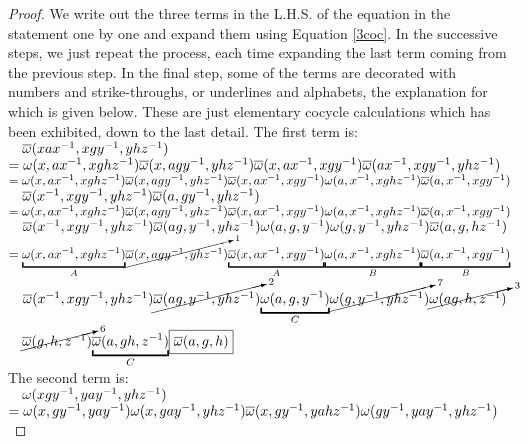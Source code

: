 \begin{proof}
We write out the three terms in the L.H.S. of the equation in the statement one by one and expand them using Equation \ref{3coc}. 
In the successive steps, we just repeat the process, each time expanding the last term coming from the previous step. In the final step, some of the terms are decorated with numbers and strike-throughs, or underlines and alphabets, the explanation for which is given below. These are just elementary cocycle calculations which has been exhibited, down to the last detail. 
The first term is:\\
$\text{ }\text{ }\text{ }\overline{\omega}(xax^{-1}, xgy^{-1}, yhz^{-1})$\\
$=\omega(x, ax^{-1}, xghz^{-1}) \overline{\omega}(x, agy^{-1}, yhz^{-1}) \overline{\omega}(x, ax^{-1}, xgy^{-1}) \overline{\omega}(ax^{-1}, xgy^{-1}, yhz^{-1})$\\
$=\omega(x, ax^{-1}, xghz^{-1}) \overline{\omega}(x, agy^{-1}, yhz^{-1}) \overline{\omega}(x, ax^{-1}, xgy^{-1}) \omega(a, x^{-1}, xghz^{-1}) \overline{\omega}(a, x^{-1}, xgy^{-1})$\\
$\text{ }\text{ }\text{ }\overline{\omega}(x^{-1}, xgy^{-1}, yhz^{-1}) \overline{\omega}(a, gy^{-1}, yhz^{-1})$\\
$=\omega(x, ax^{-1}, xghz^{-1}) \overline{\omega}(x, agy^{-1}, yhz^{-1}) \overline{\omega}(x, ax^{-1}, xgy^{-1}) \omega(a, x^{-1}, xghz^{-1}) \overline{\omega}(a, x^{-1}, xgy^{-1})$\\
$\text{ }\text{ }\text{ }\overline{\omega}(x^{-1}, xgy^{-1}, yhz^{-1}) \overline{\omega}(ag, y^{-1}, yhz^{-1}) \omega(a,g,y^{-1}) \omega(g, y^{-1},yhz^{-1}) \overline{\omega}(a,g,hz^{-1})$\\
$=\us{A}{\underbracket{\omega(x, ax^{-1}, xghz^{-1})}} \cancelto{1}{\ol{\omega}(x, agy^{-1}, yhz^{-1})} \us{A}{\underbracket{\ol{\omega}(x, ax^{-1}, xgy^{-1})}} \us{B}{\underbracket{\omega(a, x^{-1}, xghz^{-1})}} \us{B}{\underbracket{\ol{\omega}(a, x^{-1}, xgy^{-1})}}$\\
$\t{ }\t{ }\t{ }\ol{\omega}(x^{-1}, xgy^{-1}, yhz^{-1}) \cancelto{2}{\ol{\omega}(ag, y^{-1}, yhz^{-1})} \us{C}{\underbracket{\omega(a,g,y^{-1})}} \cancelto{7}{\omega(g, y^{-1},yhz^{-1})} \cancelto{3}{\omega(ag, h, z^{-1})}$\\
$\t{ }\t{ }\t{ } \cancelto{6}{\ol{\omega}(g,h,z^{-1})} \us{C}{\underbracket{\ol{\omega}(a, gh,z^{-1})}} \boxed{\ol{\omega}(a,g,h)}$\\
The second term is: \\
$\text{ }\text{ }\text{ }\omega(xgy^{-1}, yay^{-1}, yhz^{-1})$\\
$= \omega(x, gy^{-1}, yay^{-1}) \omega(x, gay^{-1}, yhz^{-1}) \overline{\omega}(x, gy^{-1}, yahz^{-1}) \omega(gy^{-1}, yay^{-1}, yhz^{-1})$\\

\end{proof}
